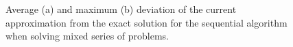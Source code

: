 \documentclass[smallcondensed]{svjour3}     %
\begin{document}
\begin{figure}
\begin{minipage}{0.5\linewidth}
\end{minipage}
\hfill
\begin{minipage}{0.5\linewidth}
\end{minipage}
\caption{Average (a) and maximum (b) deviation of the current approximation from the exact solution for the sequential algorithm when solving mixed series of problems.}
\label{fig_last5}
\end{figure}
\end{document}
